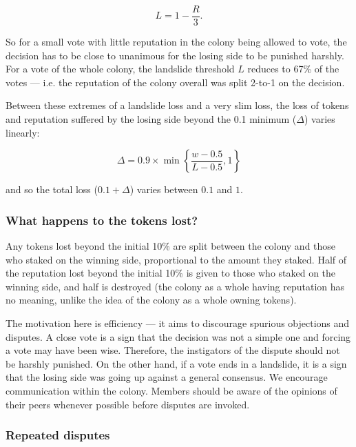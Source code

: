 \begin{equation}
L = 1 - \frac{R}{3}.
\end{equation}

So for a small vote with little reputation in the colony being allowed to vote, the decision has to be close to unanimous for the losing side to be punished harshly. For a vote of the whole colony, the landslide threshold $L$ reduces to 67\% of the votes --- i.e. the reputation of the colony overall was split 2-to-1 on the decision.

Between these extremes of a landslide loss and a very slim loss, the loss of tokens and reputation suffered by the losing side beyond the 0.1 minimum ($\Delta$) varies linearly:

\begin{equation}
 \Delta = 0.9 \times \min \left\lbrace \frac{w-0.5}{L-0.5}, 1 \right\rbrace
\end{equation}

\noindent and so the total loss ($0.1 + \Delta$) varies between $0.1$ and $1$.

\subsubsection*{What happens to the tokens lost?}

Any tokens lost beyond the initial 10\% are split between the colony and those who staked on the winning side, proportional to the amount they staked. Half of the reputation lost beyond the initial 10\% is given to those who staked on the winning side, and half is destroyed (the colony as a whole having reputation has no meaning, unlike the idea of the colony as a whole owning tokens).

The motivation here is efficiency --- it aims to discourage spurious objections and disputes. A close vote is a sign that the decision was not a simple one and forcing a vote may have been wise. Therefore, the instigators of the dispute should not be harshly punished. On the other hand, if a vote ends in a landslide, it is a sign that the losing side was going up against a general consensus. We encourage communication within the colony. Members should be aware of the opinions of their peers whenever possible before disputes are invoked.

\subsubsection*{Repeated disputes}\label{sec:repeated-disputes}

